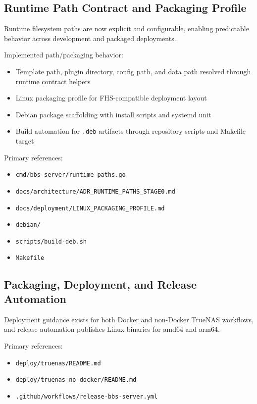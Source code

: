 \documentclass[11pt]{article}
\begin{document}
\subsection{Runtime Path Contract and Packaging Profile}
Runtime filesystem paths are now explicit and configurable, enabling predictable behavior across development and packaged deployments.

Implemented path/packaging behavior:
\begin{itemize}[leftmargin=*]
  \item Template path, plugin directory, config path, and data path resolved through runtime contract helpers
  \item Linux packaging profile for FHS-compatible deployment layout
  \item Debian package scaffolding with install scripts and systemd unit
  \item Build automation for \texttt{.deb} artifacts through repository scripts and Makefile target
\end{itemize}

Primary references:
\begin{itemize}[leftmargin=*]
  \item \texttt{cmd/bbs-server/runtime\_paths.go}
  \item \texttt{docs/architecture/ADR\_RUNTIME\_PATHS\_STAGE0.md}
  \item \texttt{docs/deployment/LINUX\_PACKAGING\_PROFILE.md}
  \item \texttt{debian/}
  \item \texttt{scripts/build-deb.sh}
  \item \texttt{Makefile}
\end{itemize}

\subsection{Packaging, Deployment, and Release Automation}
Deployment guidance exists for both Docker and non-Docker TrueNAS workflows, and release automation publishes Linux binaries for amd64 and arm64.

Primary references:
\begin{itemize}[leftmargin=*]
  \item \texttt{deploy/truenas/README.md}
  \item \texttt{deploy/truenas-no-docker/README.md}
  \item \texttt{.github/workflows/release-bbs-server.yml}
\end{itemize}
\end{document}

